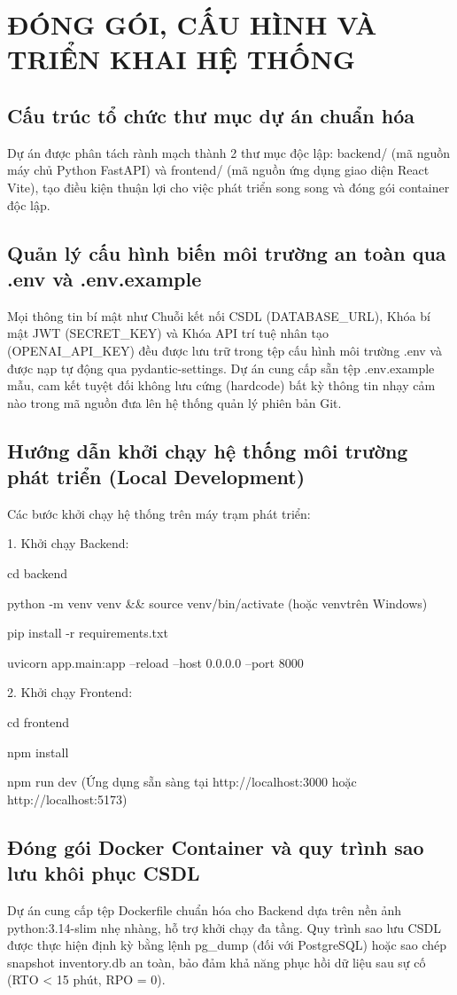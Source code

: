 \chapter{ĐÓNG GÓI, CẤU HÌNH VÀ TRIỂN KHAI HỆ THỐNG}

\section{Cấu trúc tổ chức thư mục dự án chuẩn hóa}

Dự án được phân tách rành mạch thành 2 thư mục độc lập: backend/ (mã nguồn máy chủ Python FastAPI) và frontend/ (mã nguồn ứng dụng giao diện React Vite), tạo điều kiện thuận lợi cho việc phát triển song song và đóng gói container độc lập.

\section{Quản lý cấu hình biến môi trường an toàn qua .env và .env.example}

Mọi thông tin bí mật như Chuỗi kết nối CSDL (DATABASE\_URL), Khóa bí mật JWT (SECRET\_KEY) và Khóa API trí tuệ nhân tạo (OPENAI\_API\_KEY) đều được lưu trữ trong tệp cấu hình môi trường .env và được nạp tự động qua pydantic-settings. Dự án cung cấp sẵn tệp .env.example mẫu, cam kết tuyệt đối không lưu cứng (hardcode) bất kỳ thông tin nhạy cảm nào trong mã nguồn đưa lên hệ thống quản lý phiên bản Git.

\section{Hướng dẫn khởi chạy hệ thống môi trường phát triển (Local Development)}

Các bước khởi chạy hệ thống trên máy trạm phát triển:

1. Khởi chạy Backend:

   cd backend

   python -m venv venv \&\& source venv/bin/activate (hoặc venv\Scripts\activate trên Windows)

   pip install -r requirements.txt

   uvicorn app.main:app --reload --host 0.0.0.0 --port 8000

2. Khởi chạy Frontend:

   cd frontend

   npm install

   npm run dev (Ứng dụng sẵn sàng tại http://localhost:3000 hoặc http://localhost:5173)

\section{Đóng gói Docker Container và quy trình sao lưu khôi phục CSDL}

Dự án cung cấp tệp Dockerfile chuẩn hóa cho Backend dựa trên nền ảnh python:3.14-slim nhẹ nhàng, hỗ trợ khởi chạy đa tầng. Quy trình sao lưu CSDL được thực hiện định kỳ bằng lệnh pg\_dump (đối với PostgreSQL) hoặc sao chép snapshot inventory.db an toàn, bảo đảm khả năng phục hồi dữ liệu sau sự cố (RTO < 15 phút, RPO = 0).

